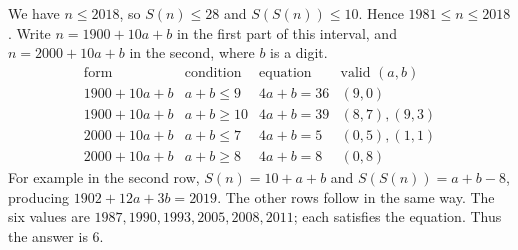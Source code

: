 We have $n\le2018$, so $S(n)\le28$ and $S(S(n))\le10$. Hence $1981\le n\le2018$. Write $n=1900+10a+b$ in the first part of this interval, and $n=2000+10a+b$ in the second, where $b$ is a digit.
\[
\begin{array}{c|c|c|c}
\text{form}&\text{condition}&\text{equation}&\text{valid }(a,b)\\ \hline
1900+10a+b&a+b\le9&4a+b=36&(9,0)\\
1900+10a+b&a+b\ge10&4a+b=39&(8,7),(9,3)\\
2000+10a+b&a+b\le7&4a+b=5&(0,5),(1,1)\\
2000+10a+b&a+b\ge8&4a+b=8&(0,8)
\end{array}
\]
For example in the second row, $S(n)=10+a+b$ and $S(S(n))=a+b-8$, producing $1902+12a+3b=2019$. The other rows follow in the same way. The six values are $1987,1990,1993,2005,2008,2011$; each satisfies the equation. Thus the answer is $\boxed6$.
